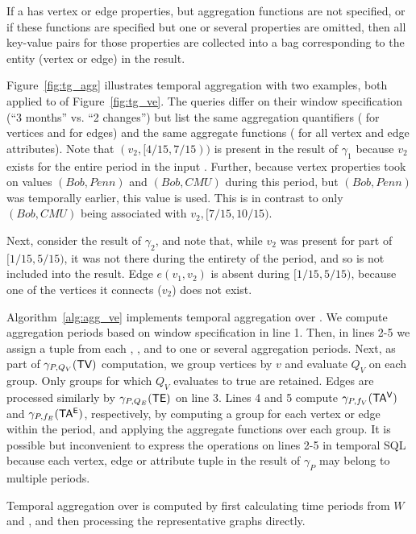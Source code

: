 If a \tg has vertex or edge properties, but aggregation functions are
not specified, or if these functions are specified but one or several
properties are omitted, then all key-value pairs for those properties
are collected into a bag corresponding to the entity (vertex or edge)
in the result.
 
Figure~\ref{fig:tg_agg} illustrates temporal aggregation with two
examples, both applied to  of Figure~\ref{fig:tg_ve}.  The
queries differ on their window specification (``3 months'' vs. ``2
changes'') but list the same aggregation quantifiers ( for
vertices and  for edges) and the same aggregate
functions ( for all vertex and edge attributes).  Note
that $(v_2, [4/15, 7/15))$ is present in the result of $\gamma_1$
  because $v_2$ exists for the entire period in the input .
  Further, because vertex properties took on values $(Bob, Penn)$ and
  $(Bob, CMU)$ during this period, but $(Bob, Penn)$ was temporally
  earlier, this value is used.  This is in contrast to only $(Bob,
  CMU)$ being associated with $v_2, [7/15, 10/15)$.
 
 Next, consider the result of $\gamma_2$, and note that, while $v_2$
 was present for part of $[1/15, 5/15)$, it was not there during the
   entirety of the period, and so is not included into the result.
   Edge $e(v_1, v_2)$ is absent during $[1/15, 5/15)$, because one of
     the vertices it connects ($v_2$) does not exist.

Algorithm~\ref{alg:agg_ve} implements temporal aggregation over \tve.
We compute aggregation periods based on window specification in line
1.  Then, in lines 2-5 we assign a tuple from each \tv, \te, \tav and
\tae to one or several aggregation periods.  Next, as part of
$\gamma_{P,Q_V}(\textsf{TV})$ computation, we group vertices by $v$ and
evaluate $Q_V$ on each group.  Only groups for which $Q_V$ evaluates
to true are retained.  Edges are processed similarly by
$\gamma_{P,Q_E}(\textsf{TE})$ on line 3.  Lines 4 and 5 compute
$\gamma_{P,f_V}(\mathsf{TA^{V}})$ and $\gamma_{P,f_E}(\mathsf{TA^{E}})$, respectively, by
computing a group for each vertex or edge within the period, and
applying the aggregate functions over each group.  It is possible but
inconvenient to express the operations on lines 2-5 in temporal SQL
because each vertex, edge or attribute tuple in the result of
$\gamma_{P}$ may belong to multiple periods.

Temporal aggregation over \trg is computed by first calculating time
periods from $W$ and \trg, and then processing the representative
graphs directly.  

